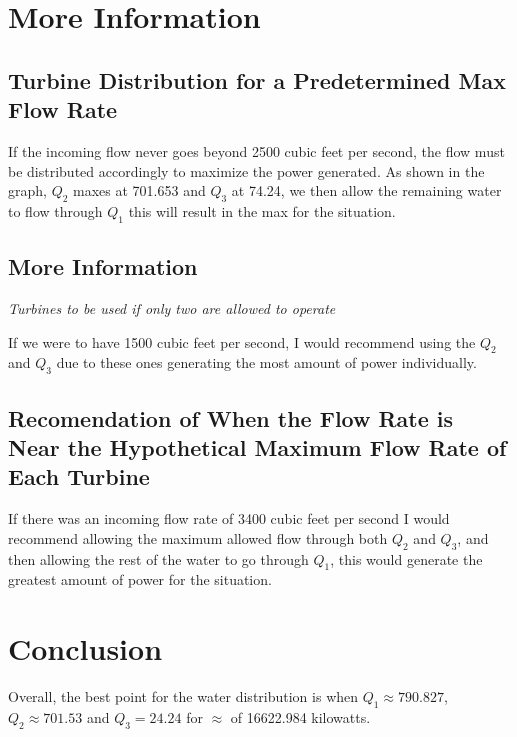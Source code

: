 \documentclass{report}
\begin{document}

\section{More Information}

\subsection{Turbine Distribution for a Predetermined Max Flow Rate}
If the incoming flow never goes beyond 2500 cubic feet per second, the flow must be distributed accordingly to maximize the power generated. As shown in the graph, $Q_2$ maxes at 701.653 and $Q_3$ at 74.24, we then allow the remaining water to flow through $Q_1$ this will result in the max for the situation.


\subsection{More Information}

\hspace{10mm} \emph{Turbines to be used if only two are allowed to operate}


If we were to have 1500 cubic feet per second, I would recommend using the $Q_2$ and $Q_3$ due to these ones generating the most amount of power individually.

\subsection{Recomendation of When the Flow Rate is Near the Hypothetical Maximum Flow Rate of Each Turbine}

If there was an incoming flow rate of 3400 cubic feet per second I would recommend allowing the maximum allowed flow through both $Q_2$ and $Q_3$, and then allowing the rest of the water to go through $Q_1$, this would generate the greatest amount of power for the situation.

\section{Conclusion}
Overall, the best point for the water distribution is when $Q_1 \approx 790.827$, $Q_2 \approx 701.53$ and $Q_3 = 24.24$ for $\approx$ of 16622.984 kilowatts.


\vspace{5mm}
\end{document}
